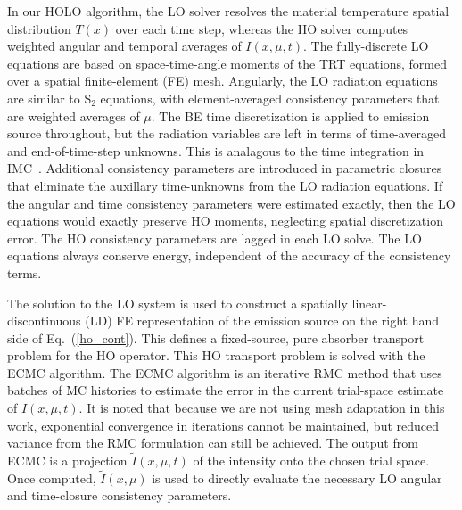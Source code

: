 \documentclass{anstrans}
\renewcommand{\eqref}[1]{(\ref{#1})}
\begin{document}
In our HOLO algorithm, the LO solver resolves the material temperature spatial distribution $T(x)$ over each time step, whereas
the HO solver computes weighted angular and temporal averages of $I(x,\mu,t)$.  The
fully-discrete LO equations are based on space-time-angle moments of the TRT equations, formed over a spatial finite-element (FE)
mesh.   Angularly, the LO
radiation equations are similar to S$_2$ equations,  with element-averaged
consistency parameters that are weighted averages of $\mu$. The BE time discretization is applied to emission source throughout, but the radiation
variables are left in terms of time-averaged and end-of-time-step unknowns.  This is analagous to
the time integration in IMC~\cite{fnc}.   Additional
consistency parameters are introduced in parametric closures that eliminate the auxillary
time-unknowns from the LO radiation equations.
If the angular and time
consistency parameters were estimated exactly, then the LO equations would exactly preserve HO moments,
neglecting spatial discretization error.  The HO consistency parameters are lagged
in each LO solve. The LO equations always conserve energy,
independent of the accuracy of the consistency terms.

The solution to the LO system is used to construct a spatially linear-discontinuous (LD) FE representation of
the emission source on the right hand side of Eq.~\eqref{ho_cont}.  This defines a fixed-source, pure absorber
transport problem for the HO operator. This HO transport problem is solved with the ECMC algorithm.  The ECMC
algorithm is an iterative RMC method that uses
batches of MC histories to estimate the error in the current trial-space estimate of 
$I(x,\mu,t)$.  It is noted that because we are not using
mesh adaptation in this work, exponential convergence in iterations cannot be maintained,
but reduced variance from the RMC formulation can still be achieved.  The output from ECMC is a projection $\tilde I(x,\mu,t)$ of the intensity onto
the chosen trial space. Once computed, $\tilde{I}(x,\mu)$ is used to directly evaluate the
necessary LO angular and time-closure consistency parameters.   
\end{document}
